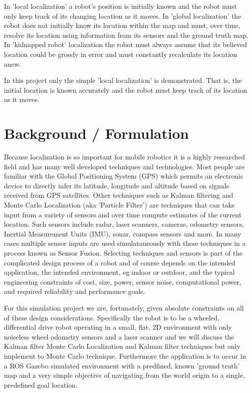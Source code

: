 \documentclass[10pt,journal,compsoc]{IEEEtran}
\begin{document}
In 'local localization' a robot's position is initially known and the robot must only keep track of its changing location as it moves. In 'global localization' the robot does not initially know its location within the map and must, over time, resolve its location using information from its sensors and the ground truth map. In 'kidnapped robot' localization the robot must always assume that its believed location could be grossly in error and must constantly recalculate its location anew. \hfill \vspace{\baselineskip}

In this project only the simple 'local localization' is demonstrated. That is, the initial location is known accurately and the robot must keep track of its location as it moves.

\section{Background / Formulation}
Because localization is so important for mobile robotics it is a highly researched field and has many well developed techniques and technologies. Most people are familiar with the Global Positioning System (GPS) which permits an electronic device to directly infer its latitude, longitude and altitude based on signals received from GPS satellites. Other techniques such as Kalman filtering and Monte Carlo Localization (aka 'Particle Filter') are techniques that can take input from a variety of sensors and over time compute estimates of the current location. Such sensors include radar, laser scanners, cameras, odometry sensors, Inertial Measurement Units (IMU), sonar, compass sensors and more. In many cases multiple sensor inputs are used simulataneously with these techniques in a process known as Sensor Fusion. Selecting techniques and sensors is part of the complicated design process of a robot and of course depends on the intended application, the intended environment, eg indoor or outdoor, and the typical engineering constraints of cost, size, power, sensor noise, computational power, and required reliability and performance goals.  \hfill \vspace{\baselineskip}

For this simulation project we are, fortunately, given absolute constraints on all of these design considerations. Specifically the robot is to be a wheeled, differential drive robot operating in a small, flat, 2D environment with only noiseless wheel odometry sensors and a laser scanner and we will discuss the Kalman filter Monte Carlo Localization  and Kalman filter techniques but only implement to Monte Carlo technique. Furthermore the application is to occur in a ROS Gazebo simulated environment with a predfined, known 'ground truth' map and a very simple objective of navigating from the world origin to a single, predefined goal location.  \hfill \vspace{\baselineskip}
\end{document}
